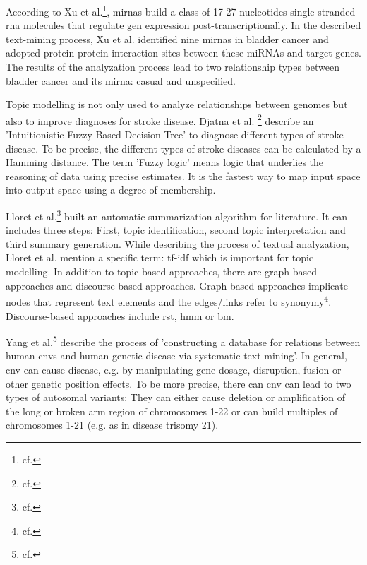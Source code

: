 According to Xu et al.\footnote{cf.\autocite{xu_2013}}, \gls{mirna}s build a class of 17-27 nucleotides single-stranded \gls{rna} molecules that regulate gen expression post-transcriptionally. In the described text-mining process, Xu et al. identified nine \gls{mirna}s in bladder cancer and adopted protein-protein interaction sites between these miRNAs and target genes. The results of the analyzation process lead to two relationship types between bladder cancer and its \gls{mirna}: casual and unspecified. 

Topic modelling is not only used to analyze relationships between genomes but also to improve diagnoses for stroke disease. Djatna et al. \footnote{cf.\autocite{djatna_2018}} describe an 'Intuitionistic Fuzzy Based Decision Tree' to diagnose different types of stroke disease. To be precise, the different types of stroke diseases can be calculated by a Hamming distance. The term 'Fuzzy logic' means logic that underlies the reasoning of data using precise estimates. It is the fastest way to map input space into output space using a degree of membership.

Lloret et al.\footnote{cf.\autocite{lloret_2012}} built an automatic summarization algorithm for literature. It can includes three steps: First, topic identification, second topic interpretation and third summary generation. While describing the process of textual analyzation, Lloret et al. mention a specific term: \gls{tf-idf} which is important for topic modelling. In addition to topic-based approaches, there are graph-based approaches and discourse-based approaches. Graph-based approaches implicate nodes that represent text elements and the edges/links refer to synonymy\footnote{cf.\autocite{lloret_2012}}. Discourse-based approaches include \gls{rst}, \gls{hmm} or \gls{bm}. 

Yang et al.\footnote{cf.\autocite{yang_2018}} describe the process of 'constructing a database for relations between human \gls{cnv}s and human genetic disease via systematic text mining'. In general, \gls{cnv} can cause disease, e.g. by manipulating gene dosage, disruption, fusion or other genetic position effects. 
To be more precise, there can \gls{cnv} can lead to two types of autosomal variants: They can either cause deletion or amplification of the long or broken arm region of chromosomes 1-22 or can build multiples of chromosomes 1-21 (e.g. as in disease trisomy 21). 


